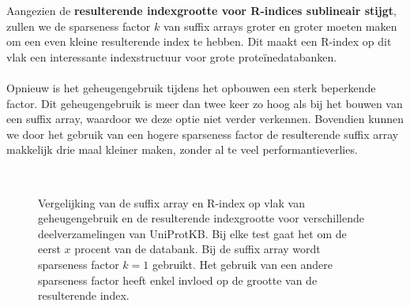 Aangezien de \textbf{resulterende indexgrootte voor R-indices sublineair stijgt}, zullen we de sparseness factor $k$ van suffix arrays groter en groter moeten maken om een even kleine resulterende index te hebben.
Dit maakt een R-index op dit vlak een interessante indexstructuur voor grote proteïnedatabanken.
\\ \\
Opnieuw is het geheugengebruik tijdens het opbouwen een sterk beperkende factor.
Dit geheugengebruik is meer dan twee keer zo hoog als bij het bouwen van een suffix array, waardoor we deze optie niet verder verkennen.
Bovendien kunnen we door het gebruik van een hogere sparseness factor de resulterende suffix array makkelijk drie maal kleiner maken, zonder al te veel performantieverlies.

\begin{figure}[H]
    \centering
    \\[4ex] %

    \caption{Vergelijking van de suffix array en R-index op vlak van geheugengebruik en de resulterende indexgrootte voor verschillende deelverzamelingen van UniProtKB. Bij elke test gaat het om de eerst $x$ procent van de databank. Bij de suffix array wordt sparseness factor $k = 1$ gebruikt. Het gebruik van een andere sparseness factor heeft enkel invloed op de grootte van de resulterende index.}\label{fig:sa_vs_r_index}
\end{figure}


